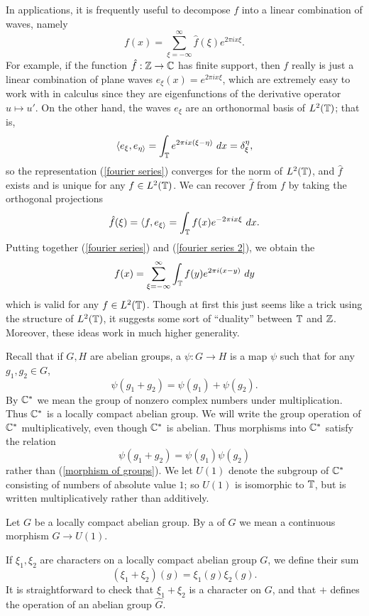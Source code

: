 In applications, it is frequently useful to decompose $f$ into a linear combination of waves, namely
\begin{equation}
\label{fourier series}
f(x) = \sum_{\xi=-\infty}^{\infty} \hat f(\xi) e^{2\pi ix\xi}.
\end{equation}
For example, if the function $\hat f: \mathbb{Z} \to \mathbb{C}$ has finite support, then $f$ really is just a linear combination of plane waves $e_\xi(x) = e^{2\pi i x\xi}$, which are extremely easy to work with in calculus since they are eigenfunctions of the derivative operator $u \mapsto u'$.
On the other hand, the waves $e_\xi$ are an orthonormal basis of $L^2(\mathbb{T})$; that is,
\[\langle e_\xi, e_{\eta\rangle} = \int_{\mathbb{T}} e^{2\pi i x(\xi - \eta)} ~dx = \delta_\xi^\eta,\]
so the representation (\ref{fourier series}) converges for the norm of $L^2(\mathbb{T})$, and $\hat f$ exists and is unique for any $f \in L^2(\mathbb{T})$.
We can recover $\hat f$ from $f$ by taking the orthogonal projections
\begin{equation}
\label{fourier series 2}
\hat f(\xi) = \langle f, e_{\xi\rangle} = \int_{\mathbb{T}} f(x) e^{-2\pi ix\xi} ~dx.
\end{equation}
Putting together (\ref{fourier series}) and (\ref{fourier series 2}), we obtain the 
\begin{equation}
\label{fourier series 3}
f(x) = \sum_{\xi = -\infty}^{\infty} \int_{\mathbb{T}} f(y) e^{2\pi i(x-y)}~dy
\end{equation}
which is valid for any $f \in L^2(\mathbb{T})$. Though at first this just seems like a trick using the structure of $L^2(\mathbb{T})$, it suggests some sort of ``duality'' between $\mathbb{T}$ and $\mathbb{Z}$.
Moreover, these ideas work in much higher generality.

Recall that if $G,H$ are abelian groups, a  $\psi: G \to H$ is a map $\psi$ such that for any $g_1, g_2 \in G$,
\begin{equation}
\label{morphism of groups}
\psi(g_1 + g_2) = \psi(g_1) + \psi(g_2).
\end{equation}
By $\mathbb{C}^*$ we mean the group of nonzero complex numbers under multiplication. Thus $\mathbb{C}^*$ is a locally compact abelian group.
We will write the group operation of $\mathbb{C}^*$ multiplicatively, even though $\mathbb{C}^*$ is abelian. Thus morphisms into $\mathbb{C}^*$ satisfy the relation
\[\psi(g_1 + g_2) = \psi(g_1)\psi(g_2)\]
rather than (\ref{morphism of groups}).
We let $U(1)$ denote the subgroup of $\mathbb{C}^*$ consisting of numbers of absolute value $1$; so $U(1)$ is isomorphic to $\mathbb{T}$, but is written multiplicatively rather than additively.
\begin{definition}
Let $G$ be a locally compact abelian group.
By a  of $G$ we mean a continuous morphism $G \to U(1)$.
\end{definition}
If $\xi_1, \xi_2$ are characters on a locally compact abelian group $G$, we define their sum
\[(\xi_1 + \xi_2)(g) = \xi_1(g)\xi_2(g).\]
It is straightforward to check that $\xi_1 + \xi_2$ is a character on $G$, and that $+$ defines the operation of an abelian group $\hat G$.


